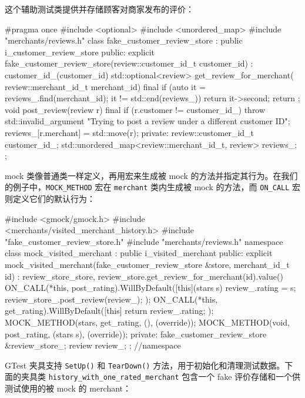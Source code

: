这个辅助测试类提供并存储顾客对商家发布的评价：

\begin{codebox}[cpp]
#pragma once
#include <optional>
#include <unordered_map>
#include "merchants/reviews.h"
class fake_customer_review_store : public i_customer_review_store {
public:
  explicit fake_customer_review_store(review::customer_id_t customer_id)
      : customer_id_(customer_id) {}
  std::optional<review> get_review_for_merchant(
      review::merchant_id_t merchant_id) final {
    if (auto it = reviews_.find(merchant_id); it != std::end(reviews_)) {
      return it->second;
    }
    return {};
  }
  void post_review(review r) final {
    if (r.customer != customer_id_) {
      throw std::invalid_argument{
          "Trying to post a review under a different customer ID"};
    }
    reviews_[r.merchant] = std::move(r);
  }
private:
  review::customer_id_t customer_id_;
  std::unordered_map<review::merchant_id_t, review> reviews_;
};
\end{codebox}

mock 类像普通类一样定义，再用宏来生成被 mock 的方法并指定其行为。在我们的例子中，\texttt{MOCK\_\allowbreak{}METHOD} 宏在 \texttt{merchant} 类内生成被 mock 的方法，而 \texttt{ON\_CALL} 宏则定义它们的默认行为：

\begin{codebox}[cpp]
#include <gmock/gmock.h>
#include <merchants/visited_merchant_history.h>
#include "fake_customer_review_store.h"
#include "merchants/reviews.h"
namespace {
class mock_visited_merchant : public i_visited_merchant {
public:
  explicit mock_visited_merchant(fake_customer_review_store &store,
                                 merchant_id_t id)
      : review_store_{store},
        review_{store.get_review_for_merchant(id).value()} {
    ON_CALL(*this, post_rating).WillByDefault([this](stars s) {
      review_.rating = s;
      review_store_.post_review(review_);
    });
    ON_CALL(*this, get_rating).WillByDefault([this] { return review_.rating; });
  }
  MOCK_METHOD(stars, get_rating, (), (override));
  MOCK_METHOD(void, post_rating, (stars s), (override));
private:
  fake_customer_review_store &review_store_;
  review review_;
};
}  //namespace
\end{codebox}

\label{idx:852}
GTest 夹具支持 \texttt{SetUp()} 和 \texttt{Tear\allowbreak{}Down(\allowbreak{})\allowbreak{}} 方法，用于初始化和清理测试数据。下面的夹具类 \texttt{history\_\allowbreak{}with\_\allowbreak{}one\_\allowbreak{}rated\_\allowbreak{}merchant} 包含一个 fake 评价存储和一个供测试使用的被 mock 的 merchant：

